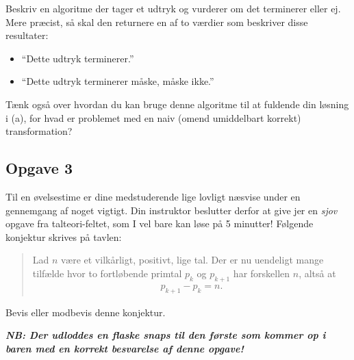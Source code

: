 Beskriv en algoritme der tager et udtryk og vurderer om det terminerer eller ej.
Mere præcist, så skal den returnere en af to værdier som beskriver disse
resultater:
\begin{itemize}
\item ``Dette udtryk terminerer.''
\item ``Dette udtryk terminerer måske, måske ikke.''
\end{itemize}

Tænk også over hvordan du kan bruge denne algoritme til at fuldende din løsning
i (a), for hvad er problemet med en naiv (omend umiddelbart korrekt)
transformation?


\subsection{Opgave 3}


Til en øvelsestime er dine medstuderende lige lovligt næsvise under en
gennemgang af noget vigtigt.  Din instruktor beslutter derfor at give jer en
\emph{sjov} opgave fra talteori-feltet, som I vel bare kan løse på 5 minutter!
Følgende konjektur skrives på tavlen:

\begin{quote}
  Lad $n$ være et vilkårligt, positivt, lige tal.  Der er nu uendeligt mange
  tilfælde hvor to fortløbende primtal $p_k$ og $p_{k+1}$ har forskellen $n$,
  altså at
\begin{align*}
p_{k+1} - p_k = n.
\end{align*}
\end{quote}

Bevis eller modbevis denne konjektur.

\vspace{.1in} \textbf{\emph{NB: Der udloddes en flaske snaps til den første som
    kommer op i baren med en korrekt besvarelse af denne opgave!}}



\setlength{\parindent}{0mm}
